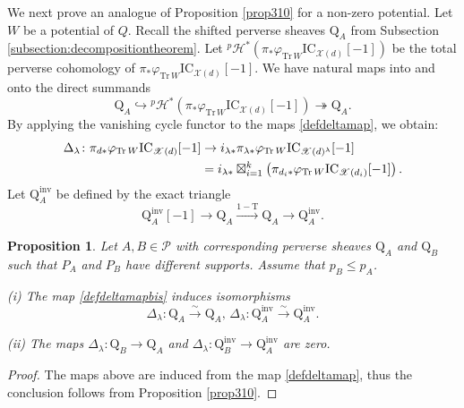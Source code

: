 \documentclass [11pt,oneside,a4paper,mathscr]{amsart}
\newtheorem{prop}[thm]{Proposition}
\theoremstyle{definition}
\renewcommand{\leq}{\leqslant}
\renewcommand{\geq}{\geqslant}
\newcommand{\X}{\mathscr{X}}
\begin{document}
We next prove an analogue of Proposition \ref{prop310} for a non-zero potential.
Let $W$ be a potential of $Q$. Recall the shifted perverse sheaves $\mathrm{Q}_A$ from Subsection \ref{subsection:decompositiontheorem}. Let ${}^p\mathcal{H}^{\ast}(\pi_*\varphi_{\mathrm{Tr}\,W}\mathrm{IC}_{\X(d)}[-1])$ be the total perverse cohomology of $\pi_*\varphi_{\mathrm{Tr}\,W}\mathrm{IC}_{\X(d)}[-1]$.
We have natural maps into and onto the 
direct summands
\[\mathrm{Q}_A \hookrightarrow {}^p\mathcal{H}^{\ast}(\pi_*\varphi_{\mathrm{Tr}\,W}\mathrm{IC}_{\X(d)}[-1])\twoheadrightarrow \mathrm{Q}_A.\]
By applying the vanishing cycle functor to the maps \eqref{defdeltamap}, we obtain:
\begin{align}\label{defdeltamapbis}
\Delta_\lambda\colon \pi_{d*}\varphi_{\mathrm{Tr}\,W}\mathrm{IC}_{\X(d)}[-1]&\to i_{\lambda*}\pi_{\lambda *}\varphi_{\mathrm{Tr}\,W}\mathrm{IC}_{\X(d)^\lambda}[-1] \\
\notag &= i_{\lambda*} \boxtimes_{i=1}^k\left(\pi_{d_i*}\varphi_{\mathrm{Tr}\,W}\mathrm{IC}_{\X(d_i)}[-1]\right).
\end{align}
Let $\mathrm{Q}_A^{\mathrm{inv}}$ be defined by the exact triangle 
\[\mathrm{Q}_A^{\mathrm{inv}}[-1]\to \mathrm{Q}_A\xrightarrow{1-\mathrm{T}}\mathrm{Q}_A\to \mathrm{Q}_A^{\mathrm{inv}}.\]

\begin{prop}\label{prop310bis}
    Let $A, B\in \mathscr{P}$ with corresponding perverse sheaves $\mathrm{Q}_A$ and $\mathrm{Q}_B$ such that $P_A$ and $P_B$ have different supports. Assume that $p_B\leq p_A$. 

    (i) %
        The map \eqref{defdeltamapbis} induces isomorphisms 
    \begin{equation}\label{mapdeltaaabis}
        \Delta_\lambda\colon \mathrm{Q}_A\xrightarrow{\sim} \mathrm{Q}_A,\, \Delta_\lambda\colon \mathrm{Q}^{\mathrm{inv}}_A\xrightarrow{\sim} \mathrm{Q}^{\mathrm{inv}}_A %
    .\end{equation}

    (ii) The maps $\Delta_\lambda \colon \mathrm{Q}_B\to \mathrm{Q}_A$ and $\Delta_\lambda \colon \mathrm{Q}^{\mathrm{inv}}_B\to \mathrm{Q}^{\mathrm{inv}}_A$ are zero. 
\end{prop}



\begin{proof}
    The maps above are induced from the map \eqref{defdeltamap}, thus the conclusion follows from Proposition \ref{prop310}.
\end{proof}
\end{document}

